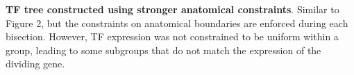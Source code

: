 \textbf{TF tree constructed using stronger anatomical constraints}. 
Similar to Figure 2, but the constraints on anatomical boundaries are enforced during each bisection. However, TF expression was not constrained to be uniform within a group, leading to some subgroups that do not match the expression of the dividing gene.

